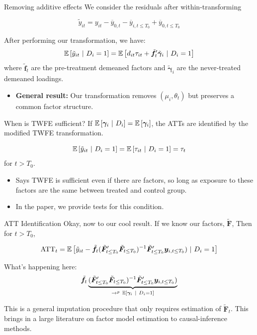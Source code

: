 \documentclass[aspectratio=43,t]{beamer}
\begin{document}
\begin{frame}{Removing additive effects}
    We consider the residuals after within-transforming 
    
    $$
      \tilde{y}_{it} = y_{it} - \overline{y}_{0,t} - \overline{y}_{i,t \leq T_0} + \overline{y}_{0, t \leq T_0}
    $$

    \pause\bigskip
    After performing our transformation, we have: 
    $$\mathbb{E}\left[\tilde{y}_{it} \ \vert \ D_i = 1\right] = \mathbb{E}\left[d_{it} \tau_{it} + \tilde{\bm f}_t' \tilde{\bm \gamma}_i  \ \vert \ D_i = 1\right]$$ 
    where $\tilde{\bm f}_t$ are the pre-treatment demeaned factors and $\tilde{\bm \gamma}_i$ are the never-treated demeaned loadings.
    
    \begin{itemize}
        \item \textbf{General result:} Our transformation removes $(\mu_i, \theta_t)$ but preserves a common factor structure.
    \end{itemize}
\end{frame}


\begin{frame}{When is TWFE sufficient?}
    If $\mathbb{E}\left[\bm \gamma_i \ \vert \ D_i\right] = \mathbb{E}\left[\bm \gamma_i\right]$, the ATTs are identified by the modified TWFE transformation.
    
    \begin{equation}
        \mathbb{E}\left[\tilde{y}_{it} \ \vert \ D_i = 1\right] = \mathbb{E}\left[\tau_{it} \ \vert \ D_i = 1\right] = \tau_t
    \end{equation}
    for $t > T_0$.
    
    \pause
    \begin{itemize}
        \item Says TWFE is sufficient even if there are factors, so long as exposure to these factors are the same between treated and control group.
        \item In the paper, we provide tests for this condition.
    \end{itemize}
\end{frame}



\begin{frame}{ATT Identification}
    Okay, now to our cool result. If we know our factors, $\tilde{\bm F}$, Then for $t > T_0$,
    
    \begin{equation}
        \text{ATT}_t = \mathbb{E}\left[ \tilde{y}_{it} - \tilde{\bm f}_t (\tilde{\bm F}_{t \leq T_0}' \tilde{\bm F}_{t \leq T_0})^{-1} \tilde{\bm F}_{t \leq T_0}' \bm y_{i, t \leq T_0})  \ \vert \ D_i = 1\right]
    \end{equation}
    
    \bigskip\pause
    What's happening here:
    $$
    \tilde{\bm f}_t \underbrace{(\tilde{\bm F}_{t \leq T_0}' \tilde{\bm F}_{t \leq T_0})^{-1} \tilde{\bm F}_{t \leq T_0}' \bm y_{i, t \leq T_0})}_{\to^p \ \condexpec{\bm \gamma_i}{D_i = 1}}
    $$
    
    \pause
    This is a general imputation procedure that only requires estimation of $\tilde{\bm F}_t$. This brings in a large literature on factor model estimation to causal-inference methods.
\end{frame}
\end{document}
